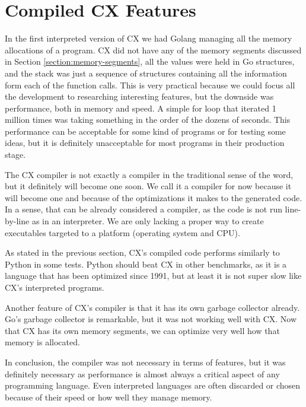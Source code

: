 \documentclass[11pt,fleqn,openany]{book} %
\begin{document}
\section{Compiled CX Features}

In the first interpreted version of CX we had Golang managing all the memory allocations of a program. CX did not have any of the memory segments discussed in Section \ref{section:memory-segments}, all the values were held in Go structures, and the stack was just a sequence of structures containing all the information form each of the function calls. This is very practical because we could focus all the development to researching interesting features, but the downside was performance, both in memory and speed. A simple for loop that iterated 1 million times was taking something in the order of the dozens of seconds. This performance can be acceptable for some kind of programs or for testing some ideas, but it is definitely unacceptable for most programs in their production stage.

The CX compiler is not exactly a compiler in the traditional sense of the word, but it definitely will become one soon. We call it a compiler for now because it will become one and because of the optimizations it makes to the generated code. In a sense, that can be already considered a compiler, as the code is not run line-by-line as in an interpreter. We are only lacking a proper way to create executables targeted to a platform (operating system and CPU).

As stated in the previous section, CX's compiled code performs similarly to Python in some tests. Python should beat CX in other benchmarks, as it is a language that has been optimized since 1991, but at least it is not super slow like CX's interpreted programs.

Another feature of CX's compiler is that it has its own garbage collector already. Go's garbage collector is remarkable, but it was not working well with CX. Now that CX has its own memory segments, we can optimize very well how that memory is allocated.

In conclusion, the compiler was not necessary in terms of features, but it was definitely necessary as performance is almost always a critical aspect of any programming language. Even interpreted languages are often discarded or chosen because of their speed or how well they manage memory.

\end{document}
